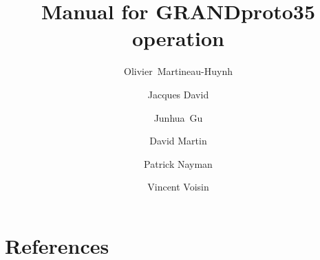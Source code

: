 \documentclass[article,12pt]{elsarticle}
\begin{document}
 
\begin{frontmatter} 
\title{Manual for GRANDproto35 operation} 
\author[lpnhe]{Olivier~Martineau-Huynh} 
\author[lpnhe]{Jacques David} 
\author[naoc]{Junhua~Gu}
\author[lpnhe]{David Martin} 
\author[lpnhe]{Patrick Nayman}
\author[lpnhe]{Vincent Voisin}

\address[lpnhe]{LPNHE, Universit\'e Pierre et Marie Curie, Universit\'e Paris Diderot, CNRS/IN2P3, Paris, France.} 
\address[naoc]{National Astronomical Observatories of China, Chinese Academy of Science, Beijing 100012, P.R. China.} 
\end{frontmatter} 








\section{References}
 
 
\end{document}
